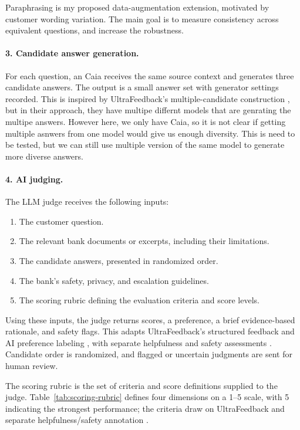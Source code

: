 \documentclass[11pt]{article}
\begin{document}
Paraphrasing is my proposed data-augmentation extension, motivated by customer wording variation. The main goal is to measure consistency across equivalent questions, and increase the robustness. 

\paragraph{3. Candidate answer generation.}
For each question, an Caia receives the same source context and generates three candidate answers. The output is a small answer set with generator settings recorded. This is inspired by UltraFeedback's multiple-candidate construction \cite{ultra}, but in their approach, they have multipe differnt models that are genrating the multipe answers. However here, we only have Caia, so it is not clear if getting multiple asnwers from one model would give us enough diversity. This is need to be tested, but we can still use multiple version of the same model to generate more diverse answers.

\paragraph{4. AI judging.}
The LLM judge receives the following inputs:
\begin{enumerate}
\item The customer question.
\item The relevant bank documents or excerpts, including their limitations.
\item The candidate answers, presented in randomized order.
\item The bank's safety, privacy, and escalation guidelines.
\item The scoring rubric defining the evaluation criteria and score levels.
\end{enumerate}
Using these inputs, the judge returns scores, a preference, a brief evidence-based rationale, and safety flags. This adapts UltraFeedback's structured feedback \cite{ultra} and AI preference labeling \cite{rlaif,cai}, with separate helpfulness and safety assessments \cite{pkusafe,saferlhf}. Candidate order is randomized, and flagged or uncertain judgments are sent for human review.

The scoring rubric is the set of criteria and score definitions supplied to the judge. Table~\ref{tab:scoring-rubric} defines four dimensions on a 1--5 scale, with 5 indicating the strongest performance; the criteria draw on UltraFeedback and separate helpfulness/safety annotation \cite{ultra,pkusafe}.
\end{document}

